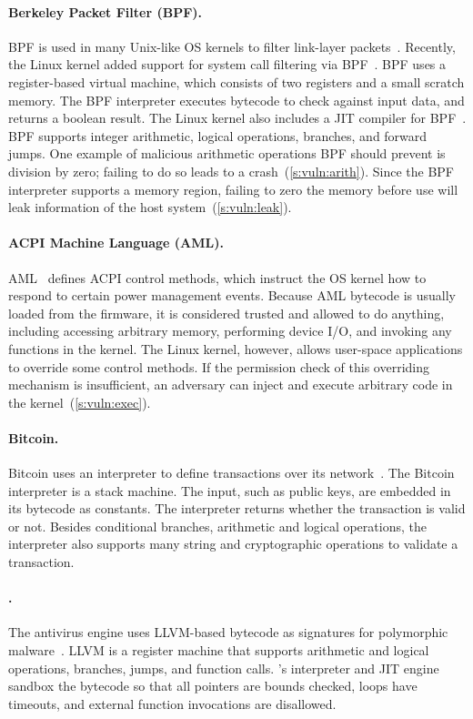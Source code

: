 \paragraph{Berkeley Packet Filter (BPF).}
%
BPF is used in many Unix-like OS kernels to filter link-layer
packets~\cite{mccanne:bpf}.
Recently, the Linux kernel added support for system call filtering
via BPF~\cite{seccomp-bpf}.
BPF uses a register-based virtual machine,
which consists of two registers and a small scratch memory.
The BPF interpreter executes bytecode to check against input data,
and returns a boolean result.
The Linux kernel also includes a JIT compiler for BPF~\cite{corbet:bpf}.
BPF supports integer arithmetic,
logical operations, branches, and forward jumps.
One example of malicious arithmetic operations BPF should prevent
is division by zero;
failing to do so leads to a crash~(\autoref{s:vuln:arith}).
Since the BPF interpreter supports a memory region,
failing to zero the memory before use
will leak information of the host system~(\autoref{s:vuln:leak}).

\paragraph{ACPI Machine Language (AML).}
%
AML~\cite{aml:spec} defines ACPI control methods, which instruct the OS kernel
how to respond to certain power management events.  Because AML bytecode is
usually loaded from the firmware, it is considered trusted and allowed to do
anything, including accessing arbitrary memory, performing device I/O, and
invoking any functions in the kernel. The Linux kernel, however, allows
user-space applications to override some control methods.
If the permission check of this overriding mechanism is insufficient,
an adversary can inject and execute arbitrary code in the
kernel~(\autoref{s:vuln:exec}).

\paragraph{Bitcoin.}
%
Bitcoin uses an interpreter to define transactions over its
network~\cite{bitcoin:script}. The Bitcoin interpreter is a stack machine.
The input, such as public keys, are embedded in its bytecode as
constants. The interpreter returns whether the transaction is valid or
not. Besides conditional branches, arithmetic and logical
operations, the interpreter also supports many string and cryptographic 
operations to validate a transaction.

\paragraph{\clamav.}
%
The \clamav antivirus engine uses LLVM-based bytecode as
signatures for polymorphic malware~\cite{clamav:llvm}.  LLVM is a
register machine that supports arithmetic and logical operations,
branches, jumps, and function calls.  \clamav's interpreter
and JIT engine sandbox the bytecode so that all pointers are
bounds checked, loops have timeouts, and external
function invocations are disallowed.

